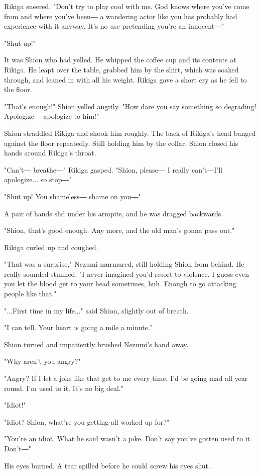 Rikiga sneered. "Don't try to play cool with me. God knows where you've
come from and where you've been― a wandering actor like you has probably
had experience with it anyway. It's no use pretending you're an
innocent―"

"Shut up!"

It was Shion who had yelled. He whipped the coffee cup and its contents
at Rikiga. He leapt over the table, grabbed him by the shirt, which was
soaked through, and leaned in with all his weight. Rikiga gave a short
cry as he fell to the floor.

"That's enough!" Shion yelled angrily. "How dare you say something so
degrading! Apologize― apologize to him!"

Shion straddled Rikiga and shook him roughly. The back of Rikiga's head
banged against the floor repeatedly. Still holding him by the collar,
Shion closed his hands around Rikiga's throat.

"Can't― breathe―" Rikiga gasped. "Shion, please― I really can't―I'll
apologize... so stop―"

"Shut up! You shameless― shame on you―"

A pair of hands slid under his armpits, and he was dragged backwards.

"Shion, that's good enough. Any more, and the old man's gonna pass out."

Rikiga curled up and coughed.

"That was a surprise," Nezumi murmured, still holding Shion from behind.
He really sounded stunned. "I never imagined you'd resort to violence. I
guess even you let the blood get to your head sometimes, huh. Enough to
go attacking people like that."

"...First time in my life..." said Shion, slightly out of breath.

"I can tell. Your heart is going a mile a minute."

Shion turned and impatiently brushed Nezumi's hand away.

"Why aren't you angry?"

"Angry? If I let a joke like that get to me every time, I'd be going mad
all year round. I'm used to it. It's no big deal."

"Idiot!"

"Idiot? Shion, what're you getting all worked up for?"

"You're an idiot. What he said wasn't a joke. Don't say you've gotten
used to it. Don't―"

His eyes burned. A tear spilled before he could screw his eyes shut.

